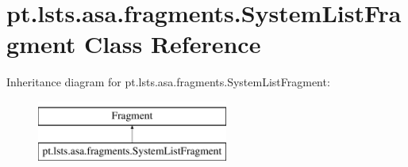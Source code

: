 \hypertarget{classpt_1_1lsts_1_1asa_1_1fragments_1_1SystemListFragment}{}\section{pt.\+lsts.\+asa.\+fragments.\+System\+List\+Fragment Class Reference}
\label{classpt_1_1lsts_1_1asa_1_1fragments_1_1SystemListFragment}
Inheritance diagram for pt.\+lsts.\+asa.\+fragments.\+System\+List\+Fragment\+:\begin{figure}[H]
\begin{center}
\leavevmode
\includegraphics[height=2.000000cm]{classpt_1_1lsts_1_1asa_1_1fragments_1_1SystemListFragment}
\end{center}
\end{figure}
